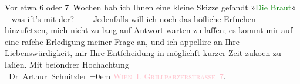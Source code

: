           \pstart
           Vor etwa 6 oder 7 Wochen hab {\pb}ich Ihnen eine kleine
                    Skizze geſandt »\textcolor{green}{Die Braut}{}\ledrightnote{\textcolor{green}{Die Braut}}« – was iſt’s mit
                    der? –\pend
           \pstart
           – Jedenfalls will ich noch das höfliche Erſuchen hinzuſetzen, mich nicht zu lang
                    auf Antwort warten zu laſſen; es kommt mir auf eine raſche Erledigung meiner
                    Frage an, und ich appellire an Ihre Liebenswürdigkeit, mir Ihre Entſcheidung in
                    möglichſt kurzer Zeit zu{\pb}ko{\geminationm}en zu laſſen.\pend
           \pstart
           Mit beſondrer Hochachtung{\\[\baselineskip]}\spacefill\mbox{ Dr Arthur Schnitzler}\pend
           \leftskip=0em{}\pstart
           \noindent{}\textcolor{pink}{\textsc{Wien I. Grillparzerstraße 7}}{}\ledrightnote{\textcolor{pink}{Grillparzerstraße}}.\pend
           \endnumbering{}  
      
